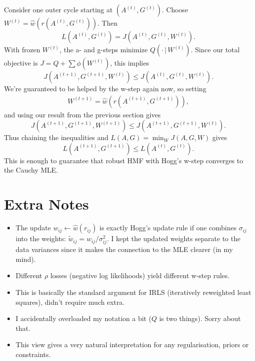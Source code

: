 \documentclass[11pt]{article}
\begin{document}
Consider one outer cycle starting at $(A^{(t)}, G^{(t)})$.  
Choose $W^{(t)} = \hat{w}(r(A^{(t)},G^{(t)}))$.  
Then
\begin{equation}
    L(A^{(t)}, G^{(t)}) = J(A^{(t)}, G^{(t)}, W^{(t)}).
\end{equation}
With frozen $W^{(t)}$, the a- and g-steps minimize $Q(\cdot \,| \,W^{(t)})$.
Since our total objective is $J = Q + \sum \phi(W^{(t)})$, this implies
\begin{equation}    
    J(A^{(t+1)}, G^{(t+1)}, W^{(t)}) \le J(A^{(t)}, G^{(t)}, W^{(t)}).
\end{equation}
We're guaranteed to be helped by the w-step again now, so setting
\begin{align}
    W^{(t+1)} = \hat{w} \left( r(A^{(t+1)}, G^{(t+1)}) \right),
\end{align}
and using our result from the previous section gives
\begin{equation}
    J(A^{(t+1)}, G^{(t+1)}, W^{(t+1)}) \le J(A^{(t+1)}, G^{(t+1)}, W^{(t)}).
\end{equation}
Thus chaining the inequalities and $L(A,G) = \min_W J(A, G, W)$ gives
\begin{equation}
    L(A^{(t+1)}, G^{(t+1)}) \le L(A^{(t)}, G^{(t)}).
\end{equation}
This is enough to guarantee that robust HMF with Hogg's w-step converges to the Cauchy MLE.

\section*{Extra Notes}

\begin{itemize}
    \item The update $w_{ij} \leftarrow \hat{w}(r_{ij})$ is exactly Hogg's update rule if one combines $\sigma_{ij}$ into the weights: 
    $\tilde{w}_{ij} = w_{ij}/\sigma_{ij}^2$. I kept the updated weights separate to the data variances since it makes the connection to the MLE clearer (in my mind).
    \item Different $\rho$ losses (negative log likelihoods) yield different w-step rules.
    \item This is basically the standard argument for IRLS (iteratively reweighted least squares), didn't require much extra.
    \item I accidentally overloaded my notation a bit ($Q$ is two things). Sorry about that.
    \item This view gives a very natural interpretation for any regularisation, priors or constraints.
\end{itemize}
\end{document}
